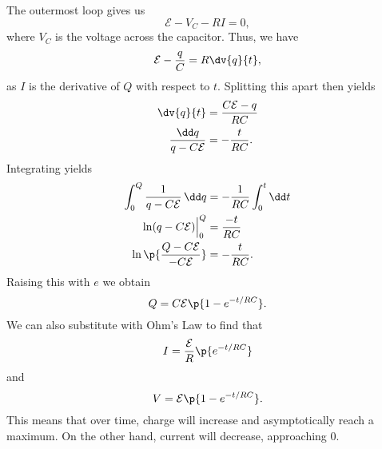 \documentclass[11pt]{article}
\begin{document}
The outermost loop gives us
\[\mathcal{E} - V_C - RI = 0,\]
where $V_C$ is the voltage across the capacitor. Thus, we have
\[\mathcal{E} - \frac{q}{C} = R\dv{q}{t},\]
as $I$ is the derivative of $Q$ with respect to $t$. Splitting this apart then yields
\begin{align*}
    \dv{q}{t} &= \frac{C\mathcal{E} - q}{RC} \\
    \frac{\dd q}{q-C\mathcal{E}} &= -\frac{t}{RC}.
\end{align*}
Integrating yields
\begin{align*}
    \int_0^{Q} \frac{1}{q-C\mathcal{E}}\,\dd q &= -\frac{1}{RC} \int_0^t \dd t \\
    \ln(q-C\mathcal{E})\Big|_0^Q &= \frac{-t}{RC} \\
    \ln\p{\frac{Q-C\mathcal{E}}{-C\mathcal{E}}} &= -\frac{t}{RC}.
\end{align*}
Raising this with $e$ we obtain
\begin{equation}
    Q = C\mathcal{E}\p{1-e^{-t/RC}}.
\end{equation}
We can also substitute with Ohm's Law to find that
\begin{equation}
    I = \frac{\mathcal{E}}{R}\p{e^{-t/RC}}
\end{equation}
and
\begin{equation}
    V = \mathcal{E}\p{1-e^{-t/RC}}.
\end{equation}
This means that over time, charge will increase and asymptotically reach a maximum. On the other hand, current will decrease, approaching 0.
\end{document}
